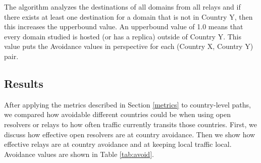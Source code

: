 The algorithm analyzes the destinations of all domains from all relays and if there exists at least one destination for a domain that is not in Country Y, then this increases the upperbound value.  An upperbound value of 1.0 means that every domain studied is hosted (or has a replica) outside of Country Y.  This value puts the Avoidance values in perspective for each (Country X, Country Y) pair. 

\subsection{Results}
After applying the metrics described in Section \ref{metrics} to country-level paths, we compared how avoidable different countries could be when using open resolvers or relays to how often traffic currently transits those countries.  First, we discuss how effective open resolvers are at country avoidance.  Then we show how effective relays are at country avoidance and at keeping local traffic local.  Avoidance values are shown in Table \ref{tab:avoid}.

